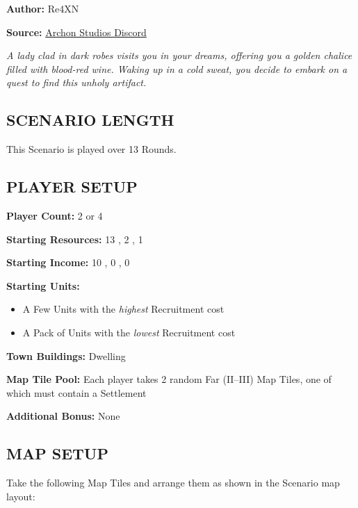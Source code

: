 
\begin{multicols*}{2}

\textbf{Author:} Re4XN

\textbf{Source:} \href{https://discord.com/channels/740870068178649108/1239631918643941509}{Archon Studios Discord}

\textit{A lady clad in dark robes visits you in your dreams, offering you a golden chalice filled with blood-red wine. Waking up in a cold sweat, you decide to embark on a quest to find this unholy artifact.}

\subsection*{\MakeUppercase{Scenario Length}}
This Scenario is played over 13 Rounds.

\subsection*{\MakeUppercase{Player Setup}}
\textbf{Player Count:} 2 or 4

\textbf{Starting Resources:} 13 , 2 , 1 

\textbf{Starting Income:} 10 , 0 , 0 

\textbf{Starting Units:}
\begin{itemize}
  \item A Few  Units with the \textit{highest} Recruitment cost
  \item A Pack of  Units with the \textit{lowest} Recruitment cost
\end{itemize}

\textbf{Town Buildings:}  Dwelling

\textbf{Map Tile Pool:} Each player takes 2 random Far (II--III) Map Tiles, one of which must contain a Settlement

\textbf{Additional Bonus:} None

\subsection*{\MakeUppercase{Map Setup}}
Take the following Map Tiles and arrange them as shown in the Scenario map layout:


\end{multicols*}
